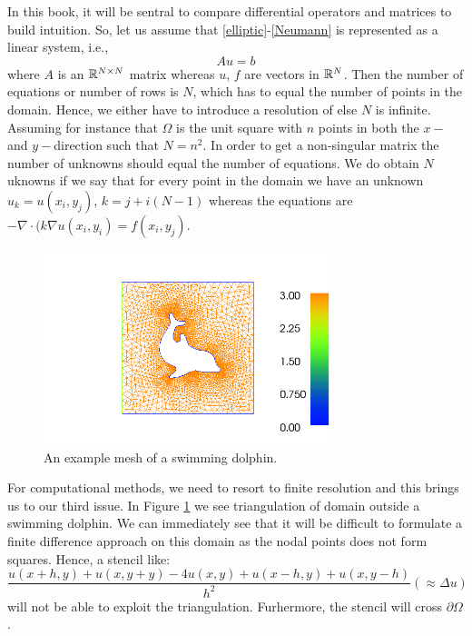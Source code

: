 In this book, it will be sentral to compare differential operators and matrices to build
intuition. So, let us assume that  
\eqref{elliptic}-\eqref{Neumann} is represented as a linear system, i.e.,  
\begin{equation}
\label{Aub}
A u = b 
\end{equation}
where $A$ is an $\mathbb{R}^{N\times N}$ matrix whereas $u$, $f$ are vectors in $\mathbb{R}^N$. 
Then the number of equations or number of rows is $N$, which has to equal the number
of points in the domain. Hence, we either have to introduce a resolution of else $N$ is 
infinite. Assuming for instance
that $\Omega$ is the unit square with $n$ points in both the $x-$ and $y-$direction such 
that $N=n^2$. In order to get a non-singular matrix the number of unknowns should
equal the number of equations. We do obtain $N$ uknowns if we say that for every
point in the domain we have an unknown $u_k = u(x_i, y_j)$, $k=j+i(N-1)$ whereas
the equations are     
$-\nabla\cdot (k \nabla  u(x_i, y_i) = f(x_i, y_j)$.    

\begin{figure}
\begin{center}
\includegraphics[width=0.75\textwidth]{chapters/elliptic/pics/dolfin_mesh.png}
\caption{An example mesh of a swimming dolphin.}
\label{fig:dolphin}
\end{center}
\end{figure}


For computational methods, we need to resort to finite resolution and this brings us to our third 
issue. In Figure \ref{fig:dolphin} we see triangulation of domain outside a swimming dolphin. We
can immediately see that it will be difficult to formulate a finite difference approach on this domain
as the nodal points does not form squares. Hence, a stencil like: 
\[
	\frac{u(x+h,y) + u(x,y+y) -4 u(x,y) + u(x-h,y) + u(x, y-h) }{h^2} (\approx \Delta u) 
\]
will not be able to exploit the triangulation. Furhermore, the stencil will cross $\partial \Omega$.   

